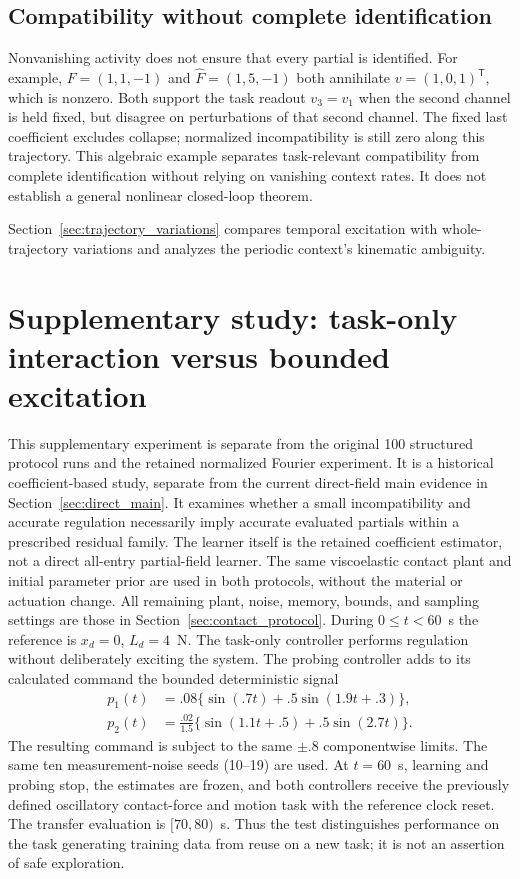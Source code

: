 \documentclass[journal]{IEEEtran}
\begin{document}
\subsection{Compatibility without complete identification}
Nonvanishing activity does not ensure that every partial is identified.
For example, $F=(1,1,-1)$ and $\widehat F=(1,5,-1)$ both annihilate
$v=(1,0,1)^{\mathsf T}$, which is nonzero. Both support the task readout
$v_3=v_1$ when the second channel is held fixed, but disagree on perturbations
of that second channel. The fixed last coefficient excludes collapse;
normalized incompatibility is still zero along this trajectory. This
algebraic example separates task-relevant compatibility from complete
identification without relying on vanishing context rates. It does not
establish a general nonlinear closed-loop theorem.

Section~\ref{sec:trajectory_variations} compares temporal excitation with
whole-trajectory variations and analyzes the periodic context's kinematic
ambiguity.

\section{Supplementary study: task-only interaction versus bounded excitation}
\label{sec:excitation}
This supplementary experiment is separate from the original 100 structured
protocol runs and the retained normalized Fourier experiment. It is a
historical coefficient-based study, separate from the current direct-field
main evidence in Section~\ref{sec:direct_main}. It examines whether a small incompatibility and accurate
regulation necessarily imply accurate evaluated partials within a prescribed
residual family. The learner itself is the retained coefficient estimator,
not a direct all-entry partial-field learner.
The same viscoelastic contact plant and initial parameter prior are used in
both protocols, without the material or actuation change. All remaining plant, noise,
memory, bounds, and sampling settings are those in
Section~\ref{sec:contact_protocol}. During $0\le t<60$~s the
reference is $x_d=0$, $L_d=4$~N. The task-only controller performs regulation
without deliberately exciting the system. The probing controller adds to
its calculated command the bounded deterministic signal
\begin{align}
 p_1(t)&=.08\{\sin(.7t)+.5\sin(1.9t+.3)\},\\
 p_2(t)&=\frac{.02}{1.5}\{\sin(1.1t+.5)+.5\sin(2.7t)\}.
\end{align}
The resulting command is subject to the same $\pm.8$ componentwise limits.
The same ten measurement-noise seeds (10--19) are used. At $t=60$~s,
learning and probing stop, the estimates are frozen, and both controllers
receive the previously defined oscillatory contact-force and motion task
with the reference clock reset. The transfer evaluation is $[70,80)$~s.
Thus the test distinguishes performance on the task generating training data
from reuse on a new task; it is not an assertion of safe exploration.
\end{document}

